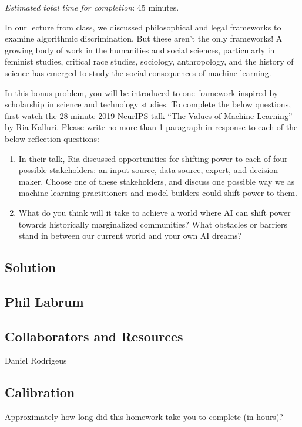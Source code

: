 \documentclass[submit]{harvardml}
\begin{document}
\begin{problem}
\emph{Estimated total time for completion}: 45 minutes.

In our lecture from class, we discussed philosophical and legal frameworks to examine algorithmic discrimination.  But these aren't the only frameworks!  A growing body of work in the humanities and social sciences, particularly in feminist studies, critical race studies, sociology, anthropology, and the history of science has emerged to study the social consequences of machine learning.

In this bonus problem, you will be introduced to one framework inspired by scholarship in science and technology studies.  To complete the below questions, first watch the 28-minute 2019 NeurIPS talk ``\href{https://slideslive.com/38923453/the-values-of-machine-learning}{The Values of Machine Learning}'' by Ria Kalluri.  Please write no more than 1 paragraph in response to each of the below reflection questions:

\begin{enumerate}
    \item In their talk, Ria discussed opportunities for shifting power to each of four possible stakeholders: an input source, data source, expert, and decision-maker.  Choose one of these stakeholders, and discuss one possible way we as machine learning practitioners and model-builders could shift power to them.
    \item What do you think will it take to achieve a world where AI can shift power towards historically marginalized communities?  What obstacles or barriers stand in between our current world and your own AI dreams?
\end{enumerate}

\end{problem}


\subsection*{Solution}

\newpage
\subsection*{Phil Labrum}

\subsection*{Collaborators and Resources}
Daniel Rodrigeus

\subsection*{Calibration}
Approximately how long did this homework take you to complete (in hours)? 
\end{document}
